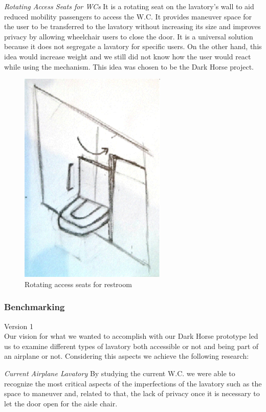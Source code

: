 \emph{Rotating Access Seats for WCs} It is a rotating seat on the lavatory’s wall to aid reduced mobility passengers to access the W.C. It provides maneuver space for the user to be transferred to the lavatory without increasing its size and improves privacy by allowing wheelchair users to close the door. It is a universal solution because it does not segregate a lavatory for specific users. On the other hand, this idea would increase weight and we still did not know how the user would react while using the mechanism. This idea was chosen to be the Dark Horse project.

\begin{figure}[h]
\centering
\includegraphics[width=7cm]{brazil_images/image011.png}
\caption{Rotating access seats for restroom}
\label{fig:rotating_seat}
\end{figure}

\subsubsection{Benchmarking}
Version 1 \\

Our vision for what we wanted to accomplish with our Dark Horse prototype led us to examine different types of lavatory both accessible or not and being part of an airplane or not.  Considering this aspects we achieve the following research:

\emph{Current Airplane Lavatory} By studying the current W.C. we were able to recognize the most critical aspects of the imperfections of the lavatory such as the space to maneuver and, related to that, the lack of privacy once it is necessary to let the door open for the aisle chair.

